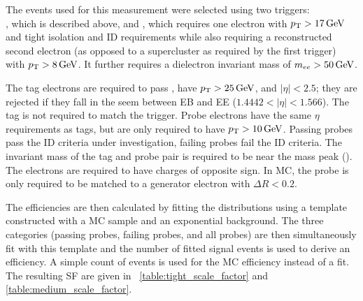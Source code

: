 The events used for this measurement were selected using two triggers: \\
\TnPTrigger, which is described above, and \TnPTriggerSecond, which requires
one electron with $p_{\mathrm{T}} > 17 \,\text{Ge\hspace{-.08em}V}$ and tight isolation and ID requirements while
also requiring a reconstructed second electron (as opposed to a supercluster as
required by the first trigger) with $p_{\mathrm{T}} > 8 \,\text{Ge\hspace{-.08em}V}$. It further requires a
dielectron invariant mass of $m_{ee} > 50 \,\text{Ge\hspace{-.08em}V}$.

The tag electrons are required to pass \EGTIGHT, have $p_{\mathrm{T}} > 25 \,\text{Ge\hspace{-.08em}V}$, and
$|\eta| < 2.5$; they are rejected if they fall in the seem between EB and EE
($1.4442 < |\eta| < 1.566$). The tag is not required to match the trigger.
Probe electrons have the same $\eta$ requirements as tags, but are only
required to have $p_{\mathrm{T}} > 10 \,\text{Ge\hspace{-.08em}V}$. Passing probes pass the ID criteria under
investigation, failing probes fail the ID criteria. The invariant mass of the
tag and probe pair is required to be near the \Z mass peak (\MassRange). The
electrons are required to have charges of opposite sign. In MC, the probe is
only required to be matched to a generator electron with $\Delta R < 0.2$.

The efficiencies are then calculated by fitting the \mee distributions using a
template constructed with a \Ztoee MC sample and an exponential background. The
three categories (passing probes, failing probes, and all probes) are then
simultaneously fit with this template and the number of fitted signal events is
used to derive an efficiency. A simple count of events is used for the MC
efficiency instead of a fit. The resulting SF are given in
\TABS~\ref{table:tight_scale_factor} and \ref{table:medium_scale_factor}.

